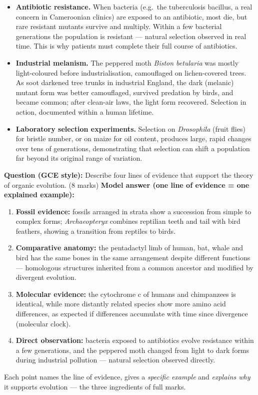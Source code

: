 \documentclass[11pt]{article}
\begin{document}
\begin{itemize}
\item \textbf{Antibiotic resistance.} When bacteria (e.g.\ the tuberculosis bacillus, a real concern in Cameroonian clinics) are exposed to an antibiotic, most die, but rare resistant mutants survive and multiply. Within a few bacterial generations the population is resistant — natural selection observed in real time. This is why patients must complete their full course of antibiotics.
\item \textbf{Industrial melanism.} The peppered moth \emph{Biston betularia} was mostly light-coloured before industrialisation, camouflaged on lichen-covered trees. As soot darkened tree trunks in industrial England, the dark (melanic) mutant form was better camouflaged, survived predation by birds, and became common; after clean-air laws, the light form recovered. Selection in action, documented within a human lifetime.
\item \textbf{Laboratory selection experiments.} Selection on \emph{Drosophila} (fruit flies) for bristle number, or on maize for oil content, produces large, rapid changes over tens of generations, demonstrating that selection can shift a population far beyond its original range of variation.
\end{itemize}

\begin{exoresolu}
\textbf{Question (GCE style):} Describe four lines of evidence that support the theory of organic evolution. \hfill (8 marks)
\tcblower
\textbf{Model answer (one line of evidence = one explained example):}
\begin{enumerate}
\item \textbf{Fossil evidence:} fossils arranged in strata show a succession from simple to complex forms; \emph{Archaeopteryx} combines reptilian teeth and tail with bird feathers, showing a transition from reptiles to birds.
\item \textbf{Comparative anatomy:} the pentadactyl limb of human, bat, whale and bird has the same bones in the same arrangement despite different functions — homologous structures inherited from a common ancestor and modified by divergent evolution.
\item \textbf{Molecular evidence:} the cytochrome c of humans and chimpanzees is identical, while more distantly related species show more amino acid differences, as expected if differences accumulate with time since divergence (molecular clock).
\item \textbf{Direct observation:} bacteria exposed to antibiotics evolve resistance within a few generations, and the peppered moth changed from light to dark forms during industrial pollution — natural selection observed directly.
\end{enumerate}
Each point names the line of evidence, gives a \emph{specific example} and \emph{explains why} it supports evolution — the three ingredients of full marks.
\end{exoresolu}
\end{document}
